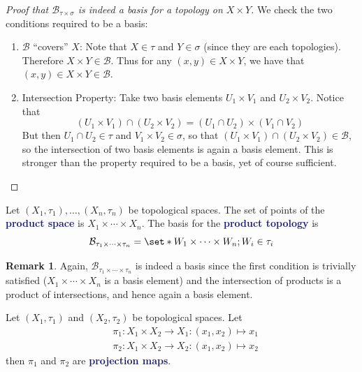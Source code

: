 \documentclass[11pt]{article}
\numberwithin{equation}{section}
\newcommand{\navy}[1]{\textcolor{MidnightBlue}{\bf #1}}
\newcounter{theo}[section]\setcounter{theo}{0}
\theoremstyle{definition}
\theoremstyle{definition}
\newtheorem*{remark}{Remark}
\def\Set{\set*}%
\newcommand{\1}{\mathbbm 1}
\def\t{\tau}
\newcommand{\bB}{\mathcal B}
\begin{document}
\begin{proof}[Proof that $\bB_{\t \times \sigma}$ is indeed a basis for a topology on $X \times Y$]
	We check the two conditions required to be a basis:
	\begin{enumerate}
		\item $\bB$ ``covers'' $X$: Note that $X \in \t$ and $Y \in \sigma$ (since they are each topologies). Therefore $X \times Y \in \bB$. Thus for any $(x,y) \in X \times Y$, we have that $(x,y) \in X \times Y \in \bB$.
		\item Intersection Property: Take two basis elements $U_1 \times V_1$ and $U_2 \times V_2$. Notice that
		\begin{equation}
			(U_1 \times V_1) \cap (U_2 \times V_2) = (U_1 \cap U_2) \times (V_1 \cap V_2)
		\end{equation}
		But then $U_1 \cap U_2 \in \t$ and $V_1 \times V_2 \in \sigma$, so that $(U_1 \times V_1) \cap (U_2 \times V_2)  \in\bB$, so the intersection of two basis elements is again a basis element. This is stronger than the property required to be a basis, yet of course sufficient.
	\end{enumerate}
\end{proof}

\begin{definition}
	Let $(X_1,\t_1), \ldots, (X_n,\t_n)$ be topological spaces. The set of points of the \navy{product space} is $X_1 \times \cdots \times X_n$. The basis for the \navy{product topology} is
	\begin{equation}
		\bB_{\t_1 \times \cdots \times \t_n} = \Set{W_1 \times \cdots \times W_n; W_i \in \t_i}
	\end{equation}
\end{definition}

\begin{remark}
	Again, $\bB_{\t_1 \times \cdots \times \t_n}$ is indeed a basis since the first condition is trivially satisfied ($X_1 \times \cdots \times X_n$ is a basis element) and the intersection of products is a product of intersections, and hence again a basis element.
\end{remark}

\begin{definition}
	Let $(X_1,\t_1)$ and $(X_2,\t_2)$ be topological spaces. Let
	\begin{align*}
		&\pi_1:X_1 \times X_2 \to X_1 : (x_1,x_2) \mapsto x_1 \\
		&\pi_2:X_1 \times X_2 \to X_2 : (x_1,x_2) \mapsto x_2
	\end{align*}
	then $\pi_1$ and $\pi_2$ are \navy{projection maps}. 
\end{definition}
\end{document}
